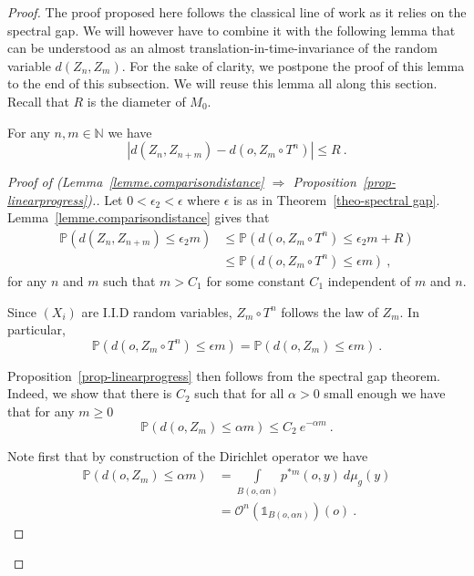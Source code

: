 \documentclass[AHL,Unicode,longabstracts,published]{cedram}
\newcommand{\dsun}{\mathds{1}}
\newcommand{\bP}{\mathbb{P}}
\newcommand{\cO}{\mathcal{O}}
\newcommand{\PP}{\mathbb{P}}
\newcommand{\NN}{\mathbb{N}}
\newcommand{\inte}[1]{\underset{#1}{\int}}
\begin{document}
\begin{proof}
The proof proposed here follows the classical line of work as it relies on the spectral gap. We will however have to combine it with the following lemma that can be understood as an almost translation-in-time-invariance of the random variable $d(Z_n,Z_m)$. For the sake of clarity, we postpone the proof of this lemma to the end of this subsection. We will reuse this lemma all along this section. Recall that $R$ is the diameter of $M_0$.

\begin{lemm}\label{lemme.comparisondistance}
For any $n, m \in \NN$ we have
\[
\left| d\left(Z_n, Z_{n+m}\right) - d\left(o, Z_{m} \circ T^n\right) \right| \le R \ .
\]
\end{lemm}


\begin{proof}[Proof of (Lemma~\ref{lemme.comparisondistance} $\Rightarrow$ Proposition~\ref{prop-linearprogress}).] Let $0 < \epsilon_2 < \epsilon$ where $\epsilon$ is as in Theorem~\ref{theo-spectral gap}. Lemma~\ref{lemme.comparisondistance} gives that
\begin{align*}
\PP\left(d\left(Z_n, Z_{n+m}\right) \le \epsilon_2 m\right) & \le \bP\left(d\left(o, Z_{m} \circ T^n\right) \le \epsilon_2 m + R\right) \\
&\le \bP\left(d\left(o, Z_{m} \circ T^n\right) \le \epsilon m\right) \ ,
\end{align*}
for any $n$ and $m$ such that $m > C_1$ for some constant $C_1$ independent of $m$ and $n$. 


Since $(X_i)$ are I.I.D random variables, $Z_m \circ T^n$ follows the law of $Z_m$. In particular,
\[
\bP\left(d\left(o, Z_{m} \circ T^n\right) \le \epsilon m\right) =\bP\left(d\left(o, Z_{m}\right) \le \epsilon m\right) \ .
\]


Proposition~\ref{prop-linearprogress} then follows from the spectral gap theorem. Indeed, we show that there is $C_2$ such that for all $\alpha > 0$ small enough we have that for any $m \ge 0$
\begin{equation}\label{eq.trouspectraluniform}
\PP\left(d\left(o, Z_{m}\right) \leq \alpha m\right) \le C_2 \ e^{- \alpha m} \ .
\end{equation}

Note first that by construction of the Dirichlet operator we have
\begin{align*}
\PP\left(d\left(o, Z_{m}\right) \leq \alpha m\right) & = \inte{B(o, \alpha n)} p^{*m}(o,y) \ d \mu_g(y) \\
& = \cO^{n}\left(\dsun_{B(o, \alpha n)}\right)(o) \ .
\end{align*}


\end{proof}
\end{proof}
\end{document}
